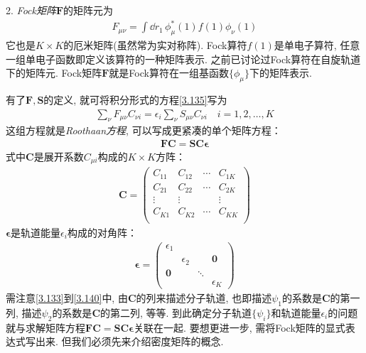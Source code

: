 2. \emph{Fock矩阵$\mathbf{F}$}的矩阵元为
\begin{align}
F_{\mu\nu} = \int\dd{r}_1\,\phi_\mu^*(1)f(1)\phi_\nu(1)
\end{align}
它也是$K\times K$的厄米矩阵(虽然常为实对称阵). Fock算符$f(1)$是单电子算符, 任意一组单电子函数即定义该算符的一种矩阵表示. 之前已讨论过Fock算符在自旋轨道下的矩阵元. Fock矩阵$\mathbf{F}$就是Fock算符在一组基函数$\{\phi_\mu\}$下的矩阵表示.

有了$\mathbf{F,S}$的定义, 就可将积分形式的\hft 方程\eqref{3.135}写为
\begin{align}
\sum_\nu F_{\mu\nu} C_{\nu i} = \epsilon_i\sum_{\nu}S_{\mu\nu}C_{\nu i}\quad i=1,2,\ldots,K
\end{align}
这组方程就是\emph{Roothaan方程}, 可以写成更紧凑的单个矩阵方程：
\begin{align}
\mathbf{FC=SC}\bm{\epsilon}
\end{align}
式中$\mathbf{C}$是展开系数$C_{\mu i}$构成的$K\times K$方阵：
\begin{align}
\label{3.140}
\mathbf{C} =
\begin{pmatrix}
C_{11} & C_{12} & \cdots & C_{1K}\\
C_{21} & C_{22} & \cdots & C_{2K}\\
\vdots & \vdots &        & \vdots\\
C_{K1} & C_{K2} & \cdots & C_{KK}\\
\end{pmatrix}
\end{align} 
$\bm{\epsilon}$是轨道能量$\epsilon_i$构成的对角阵：
\begin{align}
\bm{\epsilon} = 
\begin{pmatrix}
\epsilon_1 & & &\\
           & \epsilon_2 & & \mathbf{0}\\
           \mathbf{0} & & \ddots & \\
           &&&\epsilon_K
\end{pmatrix}
\end{align}
需注意\eqref{3.133}到\eqref{3.140}中, 由$\mathbf{C}$的列来描述分子轨道, 也即描述$\psi_1$的系数是$\mathbf{C}$的第一列, 描述$\psi_2$的系数是$\mathbf{C}$的第二列, 等等.
到此确定\hft 分子轨道$\{\psi_i\}$和轨道能量$\epsilon_i$的问题就与求解矩阵方程$\mathbf{FC=SC}\bm{\epsilon}$关联在一起. 要想更进一步, 需将Fock矩阵的显式表达式写出来. 但我们必须先来介绍密度矩阵的概念.

